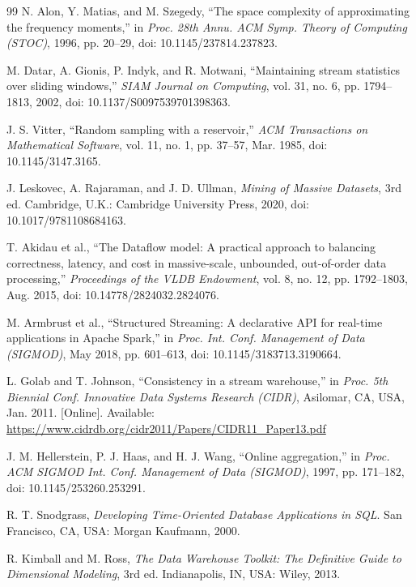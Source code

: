 \begin{thebibliography}{99}
N. Alon, Y. Matias, and M. Szegedy, ``The space complexity of approximating the frequency moments,'' in \emph{Proc. 28th Annu. ACM Symp. Theory of Computing (STOC)}, 1996, pp. 20--29, doi: 10.1145/237814.237823.

M. Datar, A. Gionis, P. Indyk, and R. Motwani, ``Maintaining stream statistics over sliding windows,'' \emph{SIAM Journal on Computing}, vol. 31, no. 6, pp. 1794--1813, 2002, doi: 10.1137/S0097539701398363.

J. S. Vitter, ``Random sampling with a reservoir,'' \emph{ACM Transactions on Mathematical Software}, vol. 11, no. 1, pp. 37--57, Mar. 1985, doi: 10.1145/3147.3165.

J. Leskovec, A. Rajaraman, and J. D. Ullman, \emph{Mining of Massive Datasets}, 3rd ed. Cambridge, U.K.: Cambridge University Press, 2020, doi: 10.1017/9781108684163.

T. Akidau et al., ``The Dataflow model: A practical approach to balancing correctness, latency, and cost in massive-scale, unbounded, out-of-order data processing,'' \emph{Proceedings of the VLDB Endowment}, vol. 8, no. 12, pp. 1792--1803, Aug. 2015, doi: 10.14778/2824032.2824076.

M. Armbrust et al., ``Structured Streaming: A declarative API for real-time applications in Apache Spark,'' in \emph{Proc. Int. Conf. Management of Data (SIGMOD)}, May 2018, pp. 601--613, doi: 10.1145/3183713.3190664.

L. Golab and T. Johnson, ``Consistency in a stream warehouse,'' in \emph{Proc. 5th Biennial Conf. Innovative Data Systems Research (CIDR)}, Asilomar, CA, USA, Jan. 2011. [Online]. Available: \url{https://www.cidrdb.org/cidr2011/Papers/CIDR11_Paper13.pdf}

J. M. Hellerstein, P. J. Haas, and H. J. Wang, ``Online aggregation,'' in \emph{Proc. ACM SIGMOD Int. Conf. Management of Data (SIGMOD)}, 1997, pp. 171--182, doi: 10.1145/253260.253291.

R. T. Snodgrass, \emph{Developing Time-Oriented Database Applications in SQL}. San Francisco, CA, USA: Morgan Kaufmann, 2000.

R. Kimball and M. Ross, \emph{The Data Warehouse Toolkit: The Definitive Guide to Dimensional Modeling}, 3rd ed. Indianapolis, IN, USA: Wiley, 2013.


\end{thebibliography}
